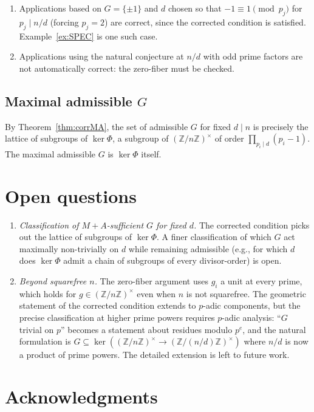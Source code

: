 \documentclass[11pt,reqno]{amsart}
\theoremstyle{plain}
\theoremstyle{definition}
\newcommand{\Z}{\mathbb{Z}}
\newcommand{\Zns}{(\Z/n\Z)^{\times}}
\begin{document}
\begin{enumerate}[label=\textup{(\alph*)}]
\item Applications based on $G = \{\pm 1\}$ and $d$ chosen so that $-1 \equiv 1 \pmod{p_j}$ for $p_j \mid n/d$ (forcing $p_j = 2$) are correct, since the corrected condition is satisfied. Example~\ref{ex:SPEC} is one such case.
\item Applications using the natural conjecture at $n/d$ with odd prime factors are not automatically correct: the zero-fiber must be checked.
\end{enumerate}

\subsection{Maximal admissible $G$}

By Theorem~\ref{thm:corrMA}, the set of admissible $G$ for fixed $d \mid n$ is precisely the lattice of subgroups of $\ker \Phi$, a subgroup of $\Zns$ of order $\prod_{p_i \mid d} (p_i - 1)$. The maximal admissible $G$ is $\ker \Phi$ itself.

\section{Open questions}

\begin{enumerate}[label=\textup{(\alph*)}]
\item \emph{Classification of $M{+}A$-sufficient $G$ for fixed $d$.} The corrected condition picks out the lattice of subgroups of $\ker \Phi$. A finer classification of which $G$ act maximally non-trivially on $d$ while remaining admissible (e.g., for which $d$ does $\ker \Phi$ admit a chain of subgroups of every divisor-order) is open.
\item \emph{Beyond squarefree $n$.} The zero-fiber argument uses $g_i$ a unit at every prime, which holds for $g \in \Zns$ even when $n$ is not squarefree. The geometric statement of the corrected condition extends to $p$-adic components, but the precise classification at higher prime powers requires $p$-adic analysis: ``$G$ trivial on $p$'' becomes a statement about residues modulo $p^e$, and the natural formulation is $G \subseteq \ker(\Zns \to (\Z/(n/d)\Z)^{\times})$ where $n/d$ is now a product of prime powers. The detailed extension is left to future work.
\end{enumerate}

\section*{Acknowledgments}
\end{document}
